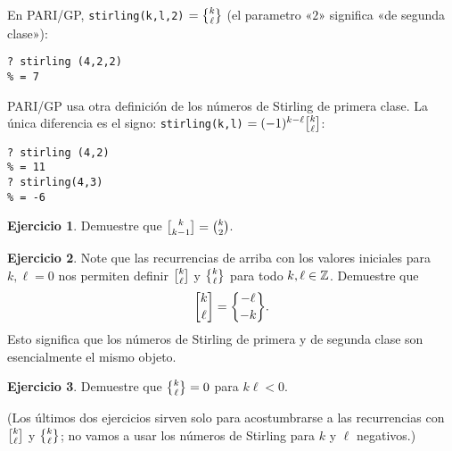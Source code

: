 \documentclass{article}
\numberwithin{equation}{section}
\theoremstyle{definition}
\newtheorem{ejercicio}{Ejercicio}
\begin{document}
\begin{shaded}
  \small\noindent En PARI/GP, \verb|stirling(k,l,2)| $= \Stirling{k}{\ell}$
  (el parametro «$2$» significa «de segunda clase»):

\begin{verbatim}
? stirling (4,2,2)
% = 7
\end{verbatim}

  \noindent PARI/GP usa otra definición de los números de Stirling de primera
  clase. La única diferencia es el signo: \verb|stirling(k,l)|
  $= (-1)^{k-\ell} \stirling{k}{\ell}$:

\begin{verbatim}
? stirling (4,2)
% = 11
? stirling(4,3) 
% = -6
\end{verbatim}
\end{shaded}

\begin{ejercicio}
  Demuestre que $\stirling{k}{k-1} = {k \choose 2}$.
\end{ejercicio}

\begin{ejercicio}
  Note que las recurrencias de arriba con los valores iniciales para
  $k, \ell = 0$ nos permiten definir $\stirling{k}{\ell}$ y $\Stirling{k}{\ell}$
  para todo $k,\ell \in \mathbb{Z}$. Demuestre que
  $$\stirling{k}{\ell} = \Stirling{-\ell}{-k}.$$
  Esto significa que los números de Stirling de primera y de segunda clase son
  esencialmente el mismo objeto.
\end{ejercicio}

\begin{ejercicio}
  Demuestre que $\Stirling{k}{\ell} = 0$ para $k\ell < 0$.
\end{ejercicio}

\noindent (Los últimos dos ejercicios sirven solo para acostumbrarse a las
recurrencias con $\stirling{k}{\ell}$ y $\Stirling{k}{\ell}$; no vamos a usar
los números de Stirling para $k$ y $\ell$ negativos.)

\pagebreak
\end{document}
